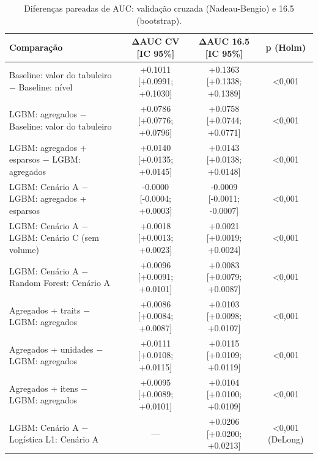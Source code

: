 \begin{table}[htbp]
\caption{Diferenças pareadas de AUC: validação cruzada (Nadeau-Bengio) e 16.5 (bootstrap).}
\label{tab:comparacoes}
\centering
\small
\begin{tabular}{lccc}
\toprule
Comparação & ΔAUC CV [IC 95\%] & ΔAUC 16.5 [IC 95\%] & p (Holm) \\
\midrule
Baseline: valor do tabuleiro − Baseline: nível & +0.1011 [+0.0991; +0.1030] & +0.1363 [+0.1338; +0.1389] & <0,001 \\
LGBM: agregados − Baseline: valor do tabuleiro & +0.0786 [+0.0776; +0.0796] & +0.0758 [+0.0744; +0.0771] & <0,001 \\
LGBM: agregados + esparsos − LGBM: agregados & +0.0140 [+0.0135; +0.0145] & +0.0143 [+0.0138; +0.0148] & <0,001 \\
LGBM: Cenário A − LGBM: agregados + esparsos & -0.0000 [-0.0004; +0.0003] & -0.0009 [-0.0011; -0.0007] & <0,001 \\
LGBM: Cenário A − LGBM: Cenário C (sem volume) & +0.0018 [+0.0013; +0.0023] & +0.0021 [+0.0019; +0.0024] & <0,001 \\
LGBM: Cenário A − Random Forest: Cenário A & +0.0096 [+0.0091; +0.0101] & +0.0083 [+0.0079; +0.0087] & <0,001 \\
Agregados + traits − LGBM: agregados & +0.0086 [+0.0084; +0.0087] & +0.0103 [+0.0098; +0.0107] & <0,001 \\
Agregados + unidades − LGBM: agregados & +0.0111 [+0.0108; +0.0115] & +0.0115 [+0.0109; +0.0119] & <0,001 \\
Agregados + itens − LGBM: agregados & +0.0095 [+0.0089; +0.0101] & +0.0104 [+0.0100; +0.0109] & <0,001 \\
LGBM: Cenário A − Logística L1: Cenário A & — & +0.0206 [+0.0200; +0.0213] & <0,001 (DeLong) \\
\bottomrule
\end{tabular}
\end{table}

